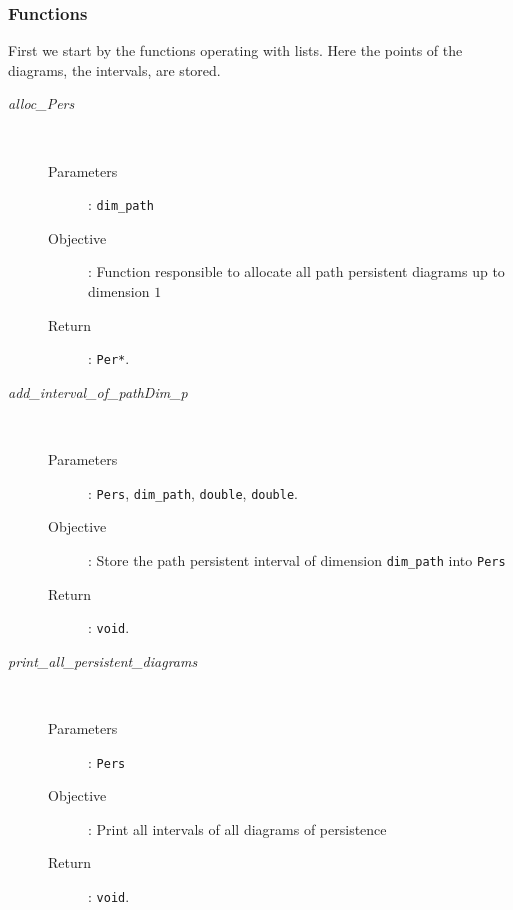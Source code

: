 \documentclass[11pt,a4paper]{article}
\begin{document}
\subsubsection{Functions}
First we start by the functions operating with lists. Here the points of the diagrams,
the intervals, are stored.
\begin{description}
	\item [\textit{alloc\_Pers}] \hfill \\[-0.5cm]
		\begin{description}
			\item [Parameters]: \texttt{dim\_path}
			\item [Objective]: Function responsible to allocate all path persistent diagrams
				up to dimension $1$
			\item [Return]: \texttt{Per*}.
		\end{description}

	\item [\textit{add\_interval\_of\_pathDim\_p}] \hfill \\[-0.5cm]
		\begin{description}
			\item [Parameters]: \texttt{Pers}, \texttt{dim\_path}, \texttt{double},
				\texttt{double}.
			\item [Objective]: Store the path persistent interval of dimension
				\texttt{dim\_path} into \texttt{Pers}
			\item [Return]: \texttt{void}.
		\end{description}

	\item [\textit{print\_all\_persistent\_diagrams}] \hfill \\[-0.5cm]
		\begin{description}
			\item [Parameters]: \texttt{Pers}
			\item [Objective]: Print all intervals of all diagrams of persistence
			\item [Return]: \texttt{void}.
		\end{description}
\end{description}
\end{document}
